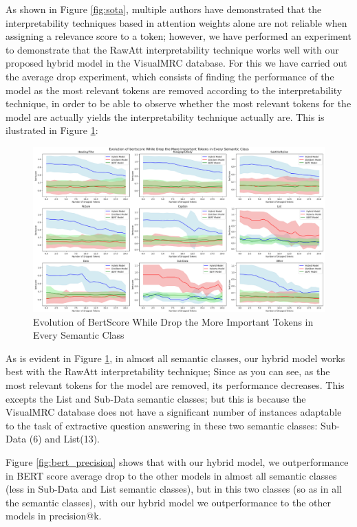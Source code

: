 As shown in Figure \ref{fig:sota}, multiple authors have demonstrated that the interpretability techniques based in attention weights alone are not reliable when assigning a relevance score to a token; however, we have performed an experiment to demonstrate that the RawAtt interpretability technique works well with our proposed hybrid model in the VisualMRC database. For this we have carried out the average drop experiment, which consists of finding the performance of the model as the most relevant tokens are removed according to the interpretability technique, in order to be able to observe whether the most relevant tokens for the model are actually yields the interpretability technique actually are. This is ilustrated in Figure \ref{fig:averagedrop}:

\begin{figure}[H]
    \centering%
    \includegraphics[width=\linewidth]{Figures/Experimental Setup/average_drop.png}
    \caption{Evolution of BertScore While Drop the More Important Tokens in Every Semantic Class}
    \label{fig:averagedrop}
\end{figure}

As is evident in Figure \ref{fig:averagedrop}, in almost all semantic classes, our hybrid model works best with the RawAtt interpretability technique; Since as you can see, as the most relevant tokens for the model are removed, its performance decreases. This excepts the List and Sub-Data semantic classes; but this is because the VisualMRC database does not have a significant number of instances adaptable to the task of extractive question answering in these two semantic classes: Sub-Data (6) and List(13).

\newpage

Figure \ref{fig:bert_precision} shows that with our hybrid model, we outperformance in BERT score average drop to the other models in almost all semantic classes (less in Sub-Data and List semantic classes), but in this two classes (so as in all the semantic classes), with our hybrid model we outperformance to the other models in precision@k.


